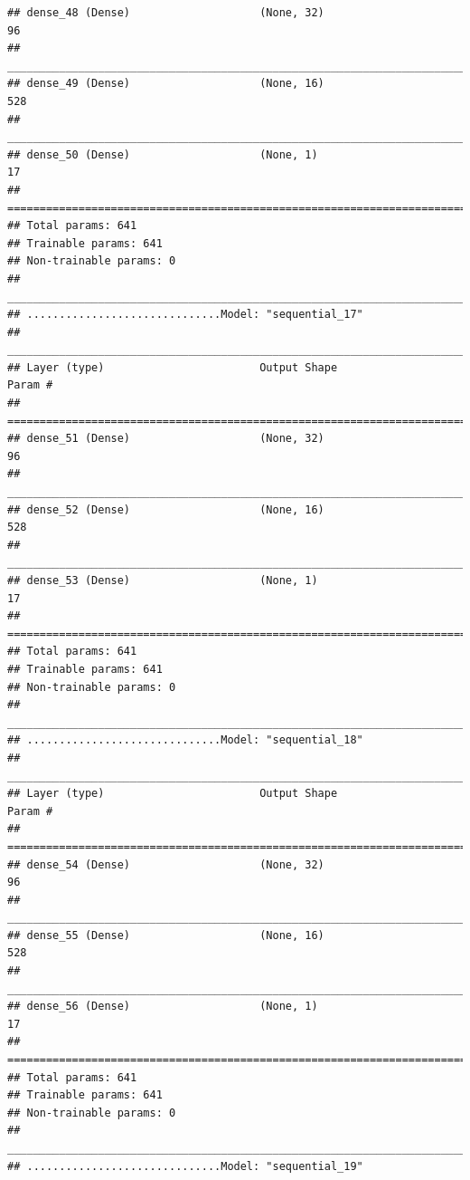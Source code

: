 \documentclass[
]{article}
\begin{document}
\begin{verbatim}
## dense_48 (Dense)                    (None, 32)                      96          
## ________________________________________________________________________________
## dense_49 (Dense)                    (None, 16)                      528         
## ________________________________________________________________________________
## dense_50 (Dense)                    (None, 1)                       17          
## ================================================================================
## Total params: 641
## Trainable params: 641
## Non-trainable params: 0
## ________________________________________________________________________________
## ..............................Model: "sequential_17"
## ________________________________________________________________________________
## Layer (type)                        Output Shape                    Param #     
## ================================================================================
## dense_51 (Dense)                    (None, 32)                      96          
## ________________________________________________________________________________
## dense_52 (Dense)                    (None, 16)                      528         
## ________________________________________________________________________________
## dense_53 (Dense)                    (None, 1)                       17          
## ================================================================================
## Total params: 641
## Trainable params: 641
## Non-trainable params: 0
## ________________________________________________________________________________
## ..............................Model: "sequential_18"
## ________________________________________________________________________________
## Layer (type)                        Output Shape                    Param #     
## ================================================================================
## dense_54 (Dense)                    (None, 32)                      96          
## ________________________________________________________________________________
## dense_55 (Dense)                    (None, 16)                      528         
## ________________________________________________________________________________
## dense_56 (Dense)                    (None, 1)                       17          
## ================================================================================
## Total params: 641
## Trainable params: 641
## Non-trainable params: 0
## ________________________________________________________________________________
## ..............................Model: "sequential_19"

\end{verbatim}
\end{document}

